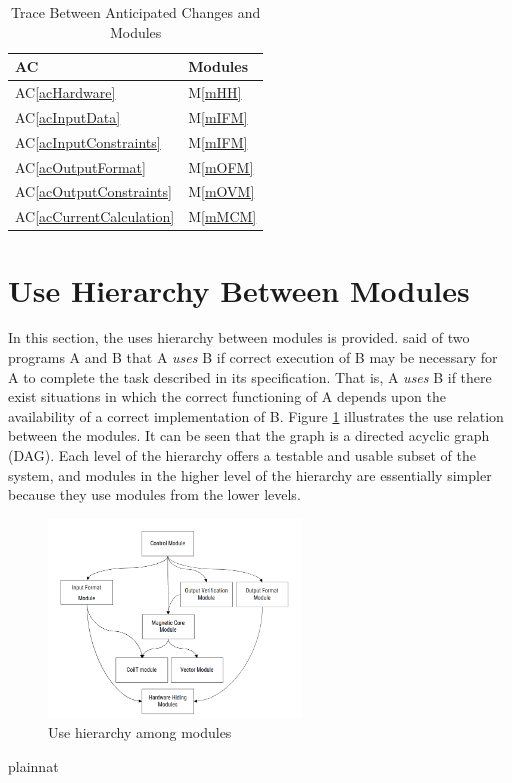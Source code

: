 \documentclass[12pt, titlepage]{article}
\newcommand{\acref}[1]{AC\ref{#1}}
\newcommand{\mref}[1]{M\ref{#1}}
\begin{document}
\begin{table}[H]
\centering
\begin{tabular}{p{} p{}}
\toprule
\textbf{AC} & \textbf{Modules}\\
\midrule
\acref{acHardware} & \mref{mHH}\\
\acref{acInputData} & \mref{mIFM}\\
\acref{acInputConstraints} & \mref{mIFM}\\
\acref{acOutputFormat} & \mref{mOFM}\\
\acref{acOutputConstraints} & \mref{mOVM}\\
\acref{acCurrentCalculation} & \mref{mMCM}\\
\bottomrule
\end{tabular}
\caption{Trace Between Anticipated Changes and Modules}
\label{TblACT}
\end{table}

\section{Use Hierarchy Between Modules} \label{SecUse}

In this section, the uses hierarchy between modules is
provided. \citet{Parnas1978} said of two programs A and B that A {\em uses} B if
correct execution of B may be necessary for A to complete the task described in
its specification. That is, A {\em uses} B if there exist situations in which
the correct functioning of A depends upon the availability of a correct
implementation of B.  Figure \ref{FigUH} illustrates the use relation between
the modules. It can be seen that the graph is a directed acyclic graph
(DAG). Each level of the hierarchy offers a testable and usable subset of the
system, and modules in the higher level of the hierarchy are essentially simpler
because they use modules from the lower levels.

\begin{figure}[H]
\centering
\includegraphics[width=0.6\textwidth]{UsesHierarchy.png}
\caption{Use hierarchy among modules}
\label{FigUH}
\end{figure}


 {plainnat}


\newpage{}
\end{document}
